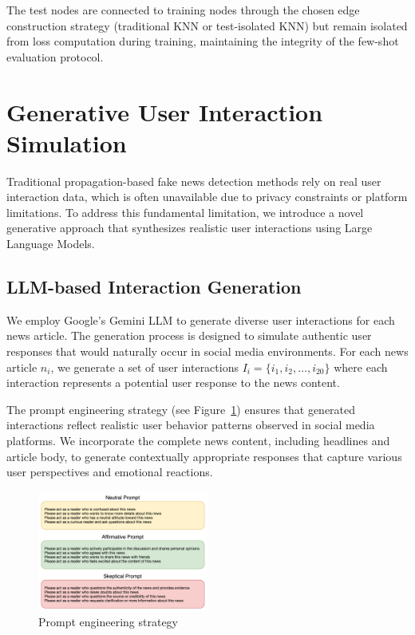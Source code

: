 The test nodes are connected to training nodes through the chosen edge construction strategy (traditional KNN or test-isolated KNN) but remain isolated from loss computation during training, maintaining the integrity of the few-shot evaluation protocol.

\section{Generative User Interaction Simulation}

Traditional propagation-based fake news detection methods rely on real user interaction data, which is often unavailable due to privacy constraints or platform limitations. To address this fundamental limitation, we introduce a novel generative approach that synthesizes realistic user interactions using Large Language Models.

\subsection{LLM-based Interaction Generation}

We employ Google's Gemini LLM to generate diverse user interactions for each news article. The generation process is designed to simulate authentic user responses that would naturally occur in social media environments. For each news article $n_i$, we generate a set of user interactions $I_i = \{i_1, i_2, \ldots, i_{20}\}$ where each interaction represents a potential user response to the news content.

The prompt engineering strategy (see Figure~\ref{fig:prompt}) ensures that generated interactions reflect realistic user behavior patterns observed in social media platforms. We incorporate the complete news content, including headlines and article body, to generate contextually appropriate responses that capture various user perspectives and emotional reactions.

\begin{figure}[h]
    \centering
    \includegraphics[width=0.5\textwidth]{context/methodology/fig/prompt.png}
    \caption{Prompt engineering strategy}
    \label{fig:prompt}
\end{figure}

